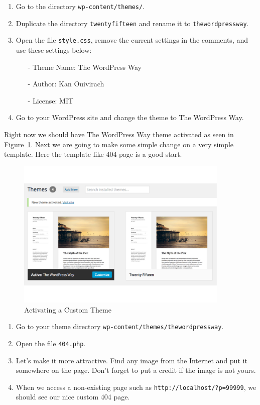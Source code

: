 \documentclass{article}
\begin{document}
\begin{enumerate}
    \item Go to the directory {\tt wp-content/themes/}.
    \item Duplicate the directory {\tt twentyfifteen} and rename it
        to {\tt thewordpressway}.
    \item Open the file {\tt style.css}, remove the current settings in the
        comments, and use these settings below:
        \begin{itemize}
            \item[-] Theme Name: The WordPress Way
            \item[-] Author: Kan Ouivirach
            \item[-] License: MIT
        \end{itemize}
    \item Go to your WordPress site and change the theme to The WordPress Way.
\end{enumerate}

\noindent Right now we should have The WordPress Way theme activated as seen in
Figure~\ref{fig:activating-custom-theme}. Next we are going to make some simple
change on a very simple template. Here the template like 404 page is a good
start.

\FloatBarrier

\begin{figure}[t]
    \centering
    \includegraphics[width=4in]{figures/activating-custom-theme}
    \caption{Activating a Custom Theme}
    \label{fig:activating-custom-theme}
\end{figure}

\begin{enumerate}
    \item Go to your theme directory {\tt wp-content/themes/thewordpressway}.
    \item Open the file {\tt 404.php}.
    \item Let's make it more attractive. Find any image from the Internet and
        put it somewhere on the page. Don't forget to put a credit if the
        image is not yours.
    \item When we access a non-existing page such as
        {\tt http://localhost/?p=99999}, we should see our nice custom
        404 page.
\end{enumerate}
\end{document}
